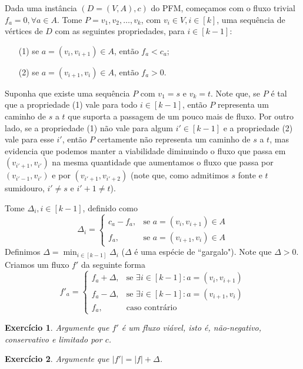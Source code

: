 \documentclass[]{article}
\newtheorem{exercicio}{Exercício}
\numberwithin{equation}{section}
\begin{document}
Dada uma instância $(D = (V, A), c)$ do PFM, começamos com o fluxo trivial
$f_a = 0, \forall a \in A$.
Tome $P = v_1, v_2, \dots, v_k$, com $v_i \in V, i \in [k]$, uma sequência de vértices
de $D$ com as seguintes propriedades, para $i \in [k - 1]$:
\begin{itemize}
  \item[(1)] se $a = (v_i, v_{i + 1}) \in A$, então $f_a < c_a$;
  \item[(2)] se $a = (v_{i + 1}, v_i) \in A$, então $f_a > 0$.
\end{itemize}
Suponha que existe uma sequência $P$ com $v_1 = s$ e $v_k = t$.
Note que, se $P$ é tal que a propriedade (1) vale para todo $i \in [k - 1]$, então $P$
representa um caminho de $s$ a $t$ que suporta a passagem de um pouco mais de fluxo.
Por outro lado, se a propriedade (1) não vale para algum $i' \in [k - 1]$ e a propriedade (2)
vale para esse $i'$, então $P$ certamente não representa um caminho de $s$ a $t$, mas
evidencia que podemos manter a viabilidade diminuindo o fluxo que passa em
$(v_{i' + 1}, v_{i'})$ na mesma quantidade que aumentamos o fluxo que passa por
$(v_{i' - 1}, v_{i'})$ e por $(v_{i' + 1}, v_{i' + 2})$ (note que, como admitimos $s$ fonte
e $t$ sumidouro, $i' \neq s$ e $i' + 1 \neq t$).

Tome $\Delta_i, i \in [k - 1]$, definido como
$$
\Delta_i =
\begin{cases}
  c_a - f_a, &  \text{se } a = (v_i, v_{i + 1}) \in A \\
  f_a,       &  \text{se } a = (v_{i + 1}, v_i) \in A
\end{cases}
$$
Definimos $\Delta = \min_{i \in [k - 1]} \Delta_i$ ($\Delta$ é uma espécie de ``gargalo").
Note que $\Delta > 0$.
Criamos um fluxo $f'$ da seguinte forma
$$
f'_a =
\begin{cases}
  f_a + \Delta, & \text{se } \exists i \in [k - 1] : a = (v_i, v_{i + 1}) \\
  f_a - \Delta, & \text{se } \exists i \in [k - 1] : a = (v_{i + 1}, v_i) \\
  f_a,          & \text{caso contrário}
\end{cases}
$$

\begin{exercicio}
  Argumente que $f'$ é um fluxo viável, isto é, não-negativo, conservativo e limitado por
  $c$.
\end{exercicio}

\begin{exercicio}
  Argumente que $|f'| = |f| + \Delta$.
\end{exercicio}
\end{document}

